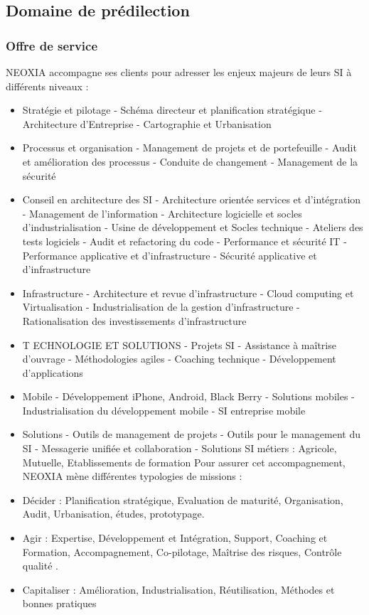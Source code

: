 \documentclass[a4paper, 12pt]{report}
\begin{document}
\subsection{Domaine de prédilection }
\subsubsection{Offre de service}
NEOXIA accompagne ses clients pour adresser les enjeux majeurs de leurs SI à différents
niveaux :
\begin{itemize}
	\item Stratégie et pilotage
- Schéma directeur et planification stratégique
- Architecture d'Entreprise
- Cartographie et Urbanisation
\item  Processus et organisation
- Management de projets et de portefeuille
- Audit et amélioration des processus
- Conduite de changement
- Management de la sécurité
\item  Conseil en architecture des SI
- Architecture orientée services et d’intégration
- Management de l’information
- Architecture logicielle et socles d’industrialisation
- Usine de développement et Socles technique
- Ateliers des tests logiciels
- Audit et refactoring du code
- Performance et sécurité IT
- Performance applicative et d'infrastructure
- Sécurité applicative et d’infrastructure
\item Infrastructure
- Architecture et revue d'infrastructure
- Cloud computing et Virtualisation
- Industrialisation de la gestion d'infrastructure
- Rationalisation des investissements d’infrastructure
\item  T ECHNOLOGIE ET SOLUTIONS
- Projets SI
- Assistance à maîtrise d’ouvrage
- Méthodologies agiles
- Coaching technique
- Développement d'applications
\item  Mobile
- Développement iPhone, Android, Black Berry
- Solutions mobiles
- Industrialisation du développement mobile
- SI entreprise mobile
\item Solutions
- Outils de management de projets
- Outils pour le management du SI
- Messagerie unifiée et collaboration
- Solutions SI métiers : Agricole, Mutuelle, Etablissements de formation
Pour assurer cet accompagnement, NEOXIA mène différentes typologies de missions :
\end{itemize}
\begin{itemize}
\item  Décider : Planification stratégique, Evaluation de maturité, Organisation, Audit,
Urbanisation, études, prototypage.
\item  Agir : Expertise, Développement et Intégration, Support, Coaching et Formation,
Accompagnement, Co-pilotage, Maîtrise des risques, Contrôle qualité .
\item  Capitaliser : Amélioration, Industrialisation, Réutilisation, Méthodes et bonnes
pratiques
\end{itemize}
\end{document}
